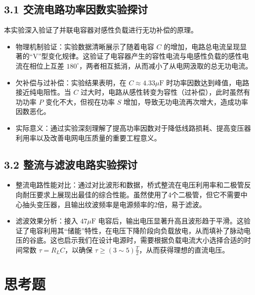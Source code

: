 \documentclass[]{../../templates/Report}%
\begin{document}
\begin{fullreportonly}
\subsection{3.1 交流电路功率因数实验探讨}
本实验深入验证了并联电容器对感性负载进行无功补偿的原理。
\begin{itemize}
    \item 物理机制验证：实验数据清晰展示了随着电容 $C$ 的增加，电路总电流呈现显著的“V”型变化规律。这验证了电容器产生的容性电流与电感性负载的感性电流在相位上互差 $180^\circ$，两者相互抵消，从而减小了从电网汲取的总无功电流。
    \item 欠补偿与过补偿：实验结果表明，在 $C \approx 4.33\mu\text{F}$ 时功率因数达到峰值，电路接近纯电阻性。当 $C$ 过大时，电路从感性转变为容性（过补偿），此时虽然有功功率 $P$ 变化不大，但视在功率 $S$ 增加，导致无功电流再次增大，造成功率因数恶化。
    \item 实际意义：通过实验深刻理解了提高功率因数对于降低线路损耗、提高变压器利用率以及改善电网电压质量的重要工程意义。
\end{itemize}

\subsection{3.2 整流与滤波电路实验探讨}
\begin{itemize}
    \item 整流电路性能对比：通过对比波形和数据，桥式整流在电压利用率和二极管反向耐压要求上展现出最佳的综合性能。虽然使用了4个二极管，但它不需要中心抽头变压器，且输出纹波频率是电源频率的2倍，易于滤波。
    \item 滤波效果分析：接入 $47\mu\text{F}$ 电容后，输出电压显著升高且波形趋于平滑。这验证了电容利用其“储能”特性，在电压下降阶段向负载放电，从而填补了脉动电压的谷底。这也启示我们在设计电源时，需要根据负载电流大小选择合适的时间常数 $\tau = R_L C$，以确保 $\tau \geq (3\sim5) \frac{T}{2}$，从而获得理想的直流电压。
\end{itemize}

\section{思考题}


\end{fullreportonly}
\end{document}
